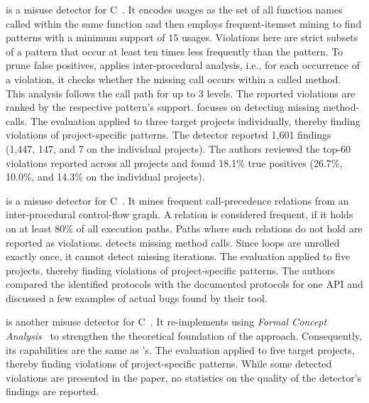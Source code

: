 \PRMiner is a misuse detector for C~\cite{LZ05}.
It encodes usages as the set of all function names called within the same function and then employs frequent-itemset mining to find patterns with a minimum support of $15$ usages.
Violations here are strict subsets of a pattern that occur at least ten times less frequently than the pattern.
To prune false positives, \PRMiner{} applies inter-procedural analysis, i.e., for each occurrence of a violation, it checks whether the missing call occurs within a called method.
This analysis follows the call path for up to 3 levels.
The reported violations are ranked by the respective pattern's support.
\PRMiner focuses on detecting missing method-calls.
The evaluation applied \PRMiner to three target projects individually, thereby finding violations of project-specific patterns.
The detector reported 1,601 findings (1,447, 147, and 7 on the individual projects).
The authors reviewed the top-60 violations reported across all projects and found 18.1\% true positives (26.7\%, 10.0\%, and 14.3\% on the individual projects).

\vspace{0.03in}

\Chronicler is a misuse detector for C~\cite{RGJ07b}.
It mines frequent call-precedence relations from an inter-procedural control-flow graph.
A relation is considered frequent, if it holds on at least 80\% of all execution paths.
Paths where such relations do not hold are reported as violations.
\Chronicler detects missing method calls.
Since loops are unrolled exactly once, it cannot detect missing iterations.
The evaluation applied \Chronicler to five projects, thereby finding violations of project-specific patterns.
The authors compared the identified protocols with the documented protocols for one API and discussed a few examples of actual bugs found by their tool.

\vspace{0.03in}

\Colibri is another misuse detector for C~\cite{L07}.
It re-implements \PRMiner using \emph{Formal Concept Analysis}~\cite{GW99} to strengthen the theoretical foundation of the approach.
Consequently, its capabilities are the same as \PRMiner's.
The evaluation applied \Colibri to five target projects, thereby finding violations of project-specific patterns.
While some detected violations are presented in the paper, no statistics on the quality of the detector's findings are reported.

